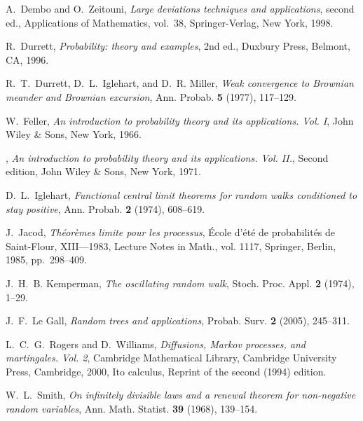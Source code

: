 \documentclass[12pt]{amsart}
\begin{document}
\begin{thebibliography}{100}
A.~Dembo and O.~Zeitouni, \emph{Large deviations techniques and
applications}, second ed., Applications of Mathematics, vol.~38,
Springer-Verlag, New York, 1998.

R.~Durrett, \emph{Probability: theory and examples}, 2nd ed., Duxbury
Press, Belmont, CA, 1996.

R.~T.~Durrett, D.~L.~Iglehart, and D.~R. Miller, \emph{Weak convergence to Brownian meander and Brownian excursion},
Ann. Probab. \textbf{5} (1977), 117--129.

W.~Feller, \emph{An introduction to probability theory and its
applications. {V}ol. {I}}, John Wiley \& Sons, New York, 1966.

\bysame,
\emph{An introduction to probability theory and its applications.
{V}ol. {II}.}, Second edition, John Wiley \& Sons, New York, 1971.

D.~L.~Iglehart,
\emph{Functional central limit theorems for random walks conditioned to stay positive}, Ann. Probab.
\textbf{2} (1974), 608--619.

J.~Jacod,
\emph{Th\'eor\`emes limite pour les processus}, \'Ecole d'\'et\'e de
probabilit\'es de Saint-Flour, XIII---1983, Lecture Notes in Math., vol.
1117, Springer, Berlin, 1985, pp.~298--409.

J.~H.~B. Kemperman, \emph{The oscillating random walk}, Stoch. Proc.
Appl. \textbf{2} (1974), 1--29.

 J.~F.~Le Gall,
\emph{Random trees and applications}, Probab. Surv. \textbf{2}
(2005), 245--311.

L.~C.~G.~Rogers and D.~Williams, \emph{Diffusions, {M}arkov processes, and
martingales. {V}ol. 2}, Cambridge Mathematical Library, Cambridge University
Press, Cambridge, 2000, Ito calculus, Reprint of the second (1994) edition.

W.~L.~Smith, \emph{On infinitely divisible laws and a renewal theorem for
non-negative random variables}, Ann. Math. Statist. \textbf{39} (1968),
139--154.
\end{thebibliography}
\end{document}
